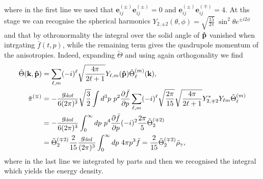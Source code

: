 where in the first line we used that $\boldsymbol{e}_{ij}^{(\pm)}\boldsymbol{e}_{ij}^{(\pm)}=0$ and $\boldsymbol{e}_{ij}^{(\pm)}\boldsymbol{e}_{ij}^{(\mp)}=4$. At ths stage we can recognise the spherical harmonics $Y_{2,\pm2}(\theta,\phi)=\sqrt{\frac{15}{2\pi}}\ \sin^2\theta e^{\pm i2\phi}$ and that by othronormality the integral over the solid angle of $\mathbf{\hat{p}}$ vanished when intrgating $\bar f(t,p)$, while the remaining term gives the quadrupole momentum of the anisotropies. Indeed, expanding $\tilde \Theta$ and using again orthogonality we find
\begin{align*}
    \tilde{\Theta}(\mathbf{k},\versor p)&=\sum_{\ell,m}(-i)^{\ell}\sqrt{\frac{4\pi}{2\ell+1}}Y_{\ell, m}(\versor p)\tilde\Theta_{\ell}^{(m)}(\mathbf k),\\
    \tilde \pi^{(\mp)}&=-\frac{g_\text{dof}}{6(2\pi)^3}\sqrt{\frac32}\int d^3p\ p^2 \frac{\partial\bar f}{\partial p}\sum_{\ell,m}(-i)^{\ell}\sqrt{\frac{2\pi}{15}}\sqrt{\frac{4\pi}{2\ell+1}}Y_{2,\mp2}^*Y_{\ell m}\tilde\Theta_{\ell}^{(m)}\\
    &=-\frac{g_\text{dof}}{6(2\pi)^3}\int_0^\infty dp\ p^4 \frac{\partial\bar f}{\partial p}(-i)^{2}\frac{2\pi}{5}\tilde\Theta_{2}^{(\mp2)}\\
    &=\tilde\Theta_{2}^{(\mp2)}\frac{2}{15}\frac{g_\text{dof}}{(2\pi)^3}\int_0^\infty dp\ 4\pi p^3 \bar f=\frac{2}{15}\tilde\Theta_2^{(\mp2)}\bar\rho_\gamma,
\end{align*}
where in the last line we integrated by parts and then we recognised the integral which yields the energy density.

